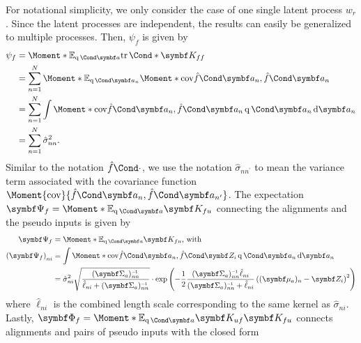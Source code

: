 For notational simplicity, we only consider the case of one single latent process $w_r$.
Since the latent processes are independent, the results can easily be generalized to multiple processes.
Then, $\psi_f$ is given by
\begin{align}
    \begin{split}
        \psi_f &= \Moment*{\E_{\Variat{\rv{a}}}}{\Fun*{\tr}{\mat{K_{ff}}}} \\
        &= \sum_{n=1}^N \Moment*{\E_{\Variat{\rv{a_n}}}}{\Moment*{\cov}{\Fun{\hat{f}}{\mat{a_n}}, \Fun{\hat{f}}{\mat{a_n}}}} \\
        &= \sum_{n=1}^N \int \Moment*{\cov}{\Fun{\hat{f}}{\mat{a_n}}, \Fun{\hat{f}}{\mat{a_n}}} \Variat{\rv{a_n}} \diff \rv{a_n} \\
        &= \sum_{n=1}^N \hat{\sigma}_{nn}^2.
    \end{split}
\end{align}
Similar to the notation $\Fun{\hat{f}}{\cdot}$, we use the notation $\hat{\sigma}_{nn^\prime}$ to mean the variance term associated with the covariance function $\Moment{\cov}{\Fun{\hat{f}}{\mat{a_n}}, \Fun{\hat{f}}{\mat{a_{n^\prime}}}}$.
The expectation $\mat{\Psi_f} = \Moment*{\E_{\Variat{\rv{a}}}}{\mat{K_{fu}}}$ connecting the alignments and the pseudo inputs is given by
\begin{align}
    \begin{split}
        \mat{\Psi_f} &= \Moment*{\E_{\Variat{\rv{a}}}}{\mat{K_{fu}}}\text{, with} \\
        \left( \mat{\Psi_f} \right)_{ni}
        &= \int \Moment*{\cov}{\Fun{\hat{f}}{\mat{a_n}}, \Fun{\hat{f}}{\mat{Z_i}}} \Variat{\rv{a_n}} \diff \rv{a_n} \\
        &= \hat{\sigma}_{ni}^2 \sqrt{\frac{(\mat{\Sigma_a})_{nn}\inv}{\hat{\ell}_{ni} + (\mat{\Sigma_a})_{nn}\inv}}
        \cdot \exp\left(-\frac{1}{2} \frac{(\mat{\Sigma_a})_{nn}\inv\hat{\ell}_{ni}}{(\mat{\Sigma_a})_{nn}\inv + \hat{\ell}_{ni}} \left((\mat{\mu_a})_n - \mat{Z_i}\right)^2\right)
    \end{split}
\end{align}
where $\hat{\ell}_{ni}$ is the combined length scale corresponding to the same kernel as $\hat{\sigma}_{ni}$.
Lastly, $\mat{\Phi_f} = \Moment*{\E_{\Variat{\rv{a}}}}{\mat{K_{uf}}\mat{K_{fu}}}$ connects alignments and pairs of pseudo inputs with the closed form
